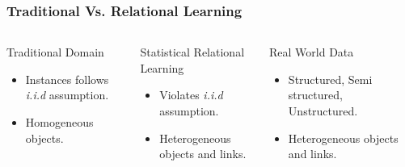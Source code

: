 \documentclass[10pt, blue,subsection=true, compress]{beamer}
\begin{document}
\begin{frame} \frametitle{Traditional Vs. Relational Learning}

\begin{columns}[t]
\begin{flushleft}
\begin{block} {Traditional Domain}\
\begin{itemize}
\item Instances follows \textit{i.i.d} assumption.
\item Homogeneous objects. 
\end{itemize}

\end{block}
\end{flushleft}

 
\begin{flushleft}
\begin{block} {Statistical Relational Learning}
\begin{itemize}
\item Violates \textit{i.i.d} assumption.
\item Heterogeneous objects and links.
\end{itemize}
\end{block}
\end{flushleft}

\column{0.3\textwidth}
 
\begin{flushleft}
\begin{block} {Real World Data}
\begin{itemize}
\item Structured, Semi structured, Unstructured.
\item Heterogeneous objects and links.
\end{itemize}
\end{block}
\end{flushleft}
\end{columns}



\end{frame}
\end{document}
